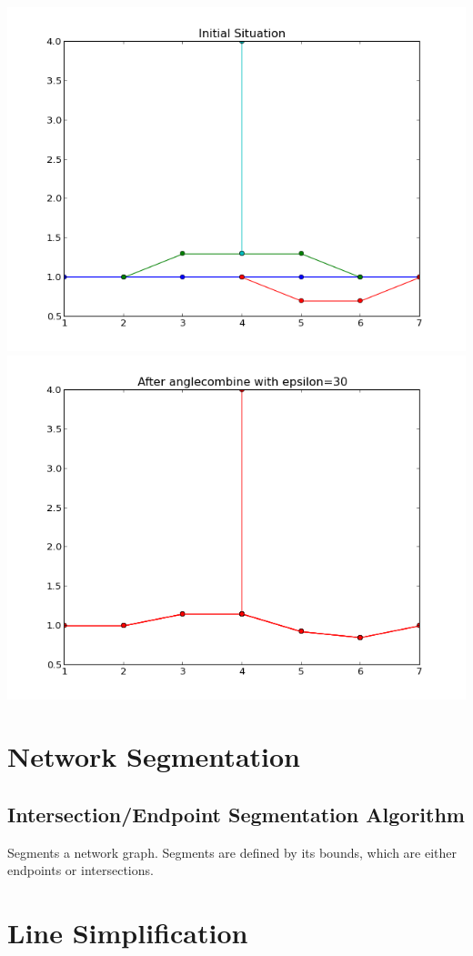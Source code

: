 \documentclass[twoside]{scrartcl}
\begin{document}
\includegraphics[scale=0.48]{comb-1.png}
\includegraphics[scale=0.48]{comb-2.png}

\section{Network Segmentation}
\subsection{Intersection/Endpoint Segmentation Algorithm}
Segments a network graph. Segments are defined by its bounds, which are
either endpoints or intersections.
\newpage

\section{Line Simplification}
\end{document}
